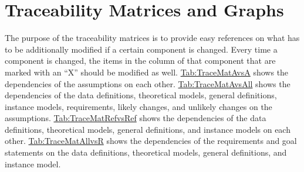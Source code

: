 \documentclass[12pt]{article}
\begin{document}
\section{Traceability Matrices and Graphs}
\label{Sec:TraceMatrices}
The purpose of the traceability matrices is to provide easy references on what has to be additionally modified if a certain component is changed. Every time a component is changed, the items in the column of that component that are marked with an ``X'' should be modified as well. \hyperref[Table:TraceMatAvsA]{Tab:TraceMatAvsA} shows the dependencies of the assumptions on each other. \hyperref[Table:TraceMatAvsAll]{Tab:TraceMatAvsAll} shows the dependencies of the data definitions, theoretical models, general definitions, instance models, requirements, likely changes, and unlikely changes on the assumptions. \hyperref[Table:TraceMatRefvsRef]{Tab:TraceMatRefvsRef} shows the dependencies of the data definitions, theoretical models, general definitions, and instance models on each other. \hyperref[Table:TraceMatAllvsR]{Tab:TraceMatAllvsR} shows the dependencies of the requirements and goal statements on the data definitions, theoretical models, general definitions, and instance model.
\end{document}
